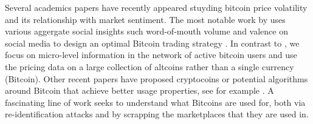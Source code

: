 Several academics papers have recently appeared stuyding bitcoin price volatility and its relationship with market sentiment. The most notable work by \cite{Garcia-bitcoin} uses various aggergate social insights such word-of-mouth volume and valence on social media to design an optimal Bitcoin trading strategy . In contrast to \cite{Garcia-bitcoin}, we focus on micro-level information in the network of active bitcoin users and use the pricing data on a large collection of altcoins rather than a single currency (Bitcoin). Other recent papers have proposed cryptocoins or potential algorithms around Bitcoin that achieve better usage properties, see for example \cite{bonneau2014mixcoin}.
A fascinating line of work \cite{meiklejohn2013fistful,soska2015measuring} seeks to understand what Bitcoins are used for, both via re-identification attacks and by scrapping the marketplaces that they are used in.

